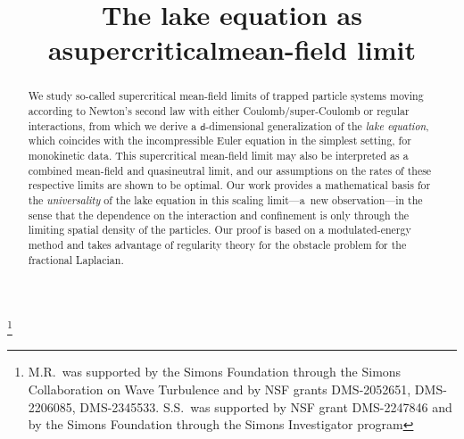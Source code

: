 \documentclass[JEP,XML,SOM,Unicode,published]{cedram}
\theoremstyle{plain}
\theoremstyle{definition}
\begin{document}
\title[The lake equation as a supercritical mean-field limit]{The lake equation as a\nobreakspace supercritical\nobreakspace mean-field limit}

\author[\initial{M.} \lastname{Rosenzweig}]{ }
\address{Carnegie Mellon University, Department of Mathematical Sciences,\\
Wean Hall 6113, Pittsburgh, PA 15213, USA}

\author[\initial{S.} \lastname{Serfaty}]{ }
\address{Sylvia Serfaty, Courant Institute of Mathematical Sciences, New York University,\\
251 Mercer Street, New York, NY 10012-1185, USA}
\address{\& Sorbonne Université, Laboratoire Jacques-Louis Lions,\\
4 place Jussieu 75005 Paris, France}

\thanks{M.R.\ was supported by the Simons Foundation through the Simons Collaboration on Wave Turbulence and by NSF grants DMS-2052651, DMS-2206085, DMS-2345533. S.S.\ was supported by NSF grant DMS-2247846 and by the Simons Foundation through the Simons Investigator program}

\begin{abstract}
We study so-called supercritical mean-field limits of trapped particle systems moving according to Newton's second law with either Coulomb/super-Coulomb or regular interactions, from which we derive a $\mathsf{d}$-dimensional generalization of the \emph{lake equation}, which coincides with the incompressible Euler equation in the simplest setting, for monokinetic data. This supercritical mean-field limit may also be interpreted as a combined mean-field and quasineutral limit, and our assumptions on the rates of these respective limits are shown to be optimal. Our work provides a mathematical basis for the \emph{universality} of the lake equation in this scaling limit---a~new observation---in the sense that the dependence on the interaction and confinement is only through the limiting spatial density of the particles. Our proof is based on a modulated-energy method and takes advantage of regularity theory for the obstacle problem for the fractional Laplacian.
\end{abstract}


\end{document}
